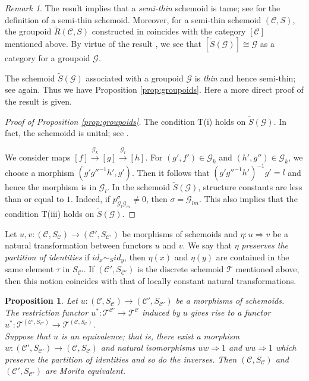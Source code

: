 \documentclass{amsart}
\newtheorem{prop}[thm]{Proposition}
\theoremstyle{definition}
\theoremstyle{remark}
\newtheorem{rem}[thm]{Remark}
\newcommand{\G}{{\mathcal G}}
\newcommand{\C}{{\mathcal C}}
\newcommand{\T}{{\mathcal T}}
\begin{document}
\begin{rem}
The result \cite[Lemma 4.4]{K-M} implies that a {\it semi-thin} schemoid is tame; see \cite[Definition 4.1]{K-M} for the definition of a 
semi-thin schemoid. Moreover, for a semi-thin schemoid $(\C, S)$, the groupoid $\widetilde{R}(\C, S)$ constructed in \cite[Section 4]
{K-M} coincides with the category $[\C]$ mentioned above. 
By virtue of the result \cite[Theorem 4.11]{K-M}, we see that $[\widetilde{S}(\G)]\cong\G$ as a category for a groupoid $\G$.
\end{rem}

The schemoid $\widetilde{S}(\G)$ associated with a groupoid $\G$ is {\it thin} and hence semi-thin; 
see \cite[Definition 4.8, Theorem 4.11]{K-M} again. Thus we have Proposition \ref{prop:groupoids}. 
Here a more direct proof of the result is given. 

\begin{proof}[Proof of Proposition \ref{prop:groupoids}] 
The condition T(i) holds on $\widetilde{S}(\G)$. In fact, the schemoidd is unital; see \cite[Theorem 4.11]{K-M}. 

We consider maps $[f] \stackrel{\G_k}{\longrightarrow} [g] \stackrel{\G_l}{\longrightarrow} [h]$. 
For $(g', f') \in \G_k$ and $(h', g'') \in \G_k$, we choose a morphism $(g'{g''}^{-1}h', g')$. Then it follows that 
$(g'{g''}^{-1}h')^{-1}g' = l$ and hence the morphism is in $\G_l$. In the schemoid $\widetilde{S}(\G)$, 
structure constants are less than or equal to $1$. 
Indeed, if $p_{\G_l\G_m}^\sigma \neq 0$, then $\sigma = \G_{lm}$. This also implies that the condition T(iii) holds on 
$\widetilde{S}(\G)$.
\end{proof}

Let  $u, v:  (\C, S_{\C}) \to (\C', S_{\C'})$ be morphisms of schemoids and $\eta : u \Rightarrow v$ be a natural transformation between functors $u$ and $v$.  We say that $\eta$ {\it preserves the partition of identities} if 
$id_x \sim_S id_y$, then $\eta(x)$ and $\eta(y)$ are contained in the same element $\tau$ in $S_{\C'}$. 
If $(\C', S_{\C'})$ is the discrete schemoid $\T$ mentioned above, then this notion coincides with that of 
locally constant natural transformations. 

\begin{prop}\label{prop:equivalence} Let $u :  (\C, S_{\C}) \to (\C', S_{\C'})$ be a morphisms of schemoids. \\
 The restriction functor $u^* : \T^{\C'} \to  \T^{\C}$ induced by $u$  gives rise to a functor 
$u^* : \T^{(\C', S_{\C'})} \to  \T^{(\C, S_{\C})}$.  \\
   Suppose that $u$ 
is an {\it equivalence}; that is, there exist a morphism $w :  (\C', S_{\C'}) \to (\C, S_{\C})$
and natural isomorphisms $uw \Rightarrow 1$ and $wu \Rightarrow 1$ which preserve 
the partition of identities and so do the inverses. Then $(\C, S_{\C})$ and $(\C', S_{\C'})$ are Morita equivalent. 
\end{prop}
\end{document}
